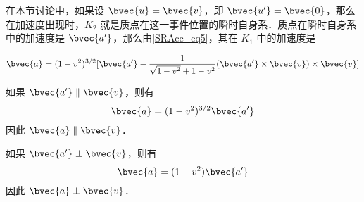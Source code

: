 在本节讨论中，如果设 $\bvec{u}=\bvec{v}$，即 $\bvec{u'}=\bvec{0}$，那么在加速度出现时，$K_2$ 就是质点在这一事件位置的瞬时自身系．质点在瞬时自身系中的加速度是 $\bvec{a'}$，那么由\autoref{SRAcc_eq5}，其在 $K_1$ 中的加速度是

\begin{equation}
\bvec{a}=(1-v^2)^{3/2}[\bvec{a'}-\frac{1}{\sqrt{1-v^2}+1-v^2}(\bvec{a'}\times\bvec{v})\times\bvec{v}]
\end{equation}

如果 $\bvec{a'}\parallel \bvec{v}$，则有
\begin{equation}
\bvec{a}=(1-v^2)^{3/2}\bvec{a'}
\end{equation}
因此 $\bvec{a}\parallel\bvec{v}$．

如果 $\bvec{a'}\perp \bvec{v}$，则有
\begin{equation}
\bvec{a}=(1-v^2)\bvec{a'}
\end{equation}
因此 $\bvec{a}\perp\bvec{v}$．


